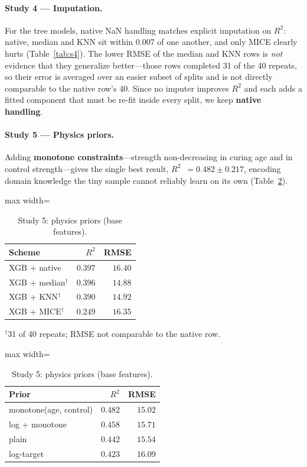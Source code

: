 \documentclass[11pt]{article}
\newcommand{\R}{$R^2$}
\begin{document}
\paragraph{Study 4 --- Imputation.}
For the tree models, native NaN handling matches explicit imputation on \R{}: native,
median and KNN sit within 0.007 of one another, and only MICE clearly hurts
(Table~\ref{tab:s4}). The lower RMSE of the median and KNN rows is \emph{not} evidence
that they generalize better---those rows completed 31 of the 40 repeats, so their error
is averaged over an easier subset of splits and is not directly comparable to the
native row's 40. Since no imputer improves \R{} and each adds a fitted component that
must be re-fit inside every split, we keep \textbf{native handling}.

\paragraph{Study 5 --- Physics priors.}
Adding \textbf{monotone constraints}---strength non-decreasing in curing age and in
control strength---gives the single best result, \R{}~$=0.482\pm0.217$, encoding
domain knowledge the tiny sample cannot reliably learn on its own (Table~\ref{tab:s5}).
\begin{table}[H]\centering\small
\begin{minipage}{0.46\textwidth}\centering
\caption{Study 4: imputation (framing C).}
\label{tab:s4}
\begin{adjustbox}{max width=\linewidth}
\begin{tabular}{lrr}
\toprule
Scheme & \R{} & RMSE \\
\midrule
\rowcolor{green!12}XGB + native & $0.397$ & $16.40$ \\
XGB + median$^{\dagger}$ & $0.396$ & $14.88$ \\
XGB + KNN$^{\dagger}$ & $0.390$ & $14.92$ \\
XGB + MICE$^{\dagger}$ & $0.249$ & $16.35$ \\
\bottomrule
\end{tabular}
\end{adjustbox}
{\scriptsize $^{\dagger}$31 of 40 repeats; RMSE not comparable to the native row.}
\end{minipage}\hfill
\begin{minipage}{0.5\textwidth}\centering
\caption{Study 5: physics priors (base features).}
\label{tab:s5}
\begin{adjustbox}{max width=\linewidth}
\begin{tabular}{lrr}
\toprule
Prior & \R{} & RMSE \\
\midrule
\rowcolor{green!12}monotone(age, control) & $0.482$ & $15.02$ \\
log + monotone & $0.458$ & $15.71$ \\
plain & $0.442$ & $15.54$ \\
log-target & $0.423$ & $16.09$ \\
\bottomrule
\end{tabular}
\end{adjustbox}
\end{minipage}
\end{table}
\end{document}
